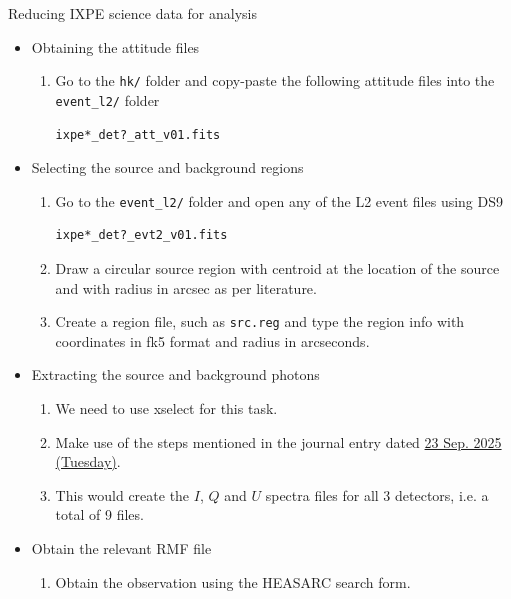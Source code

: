 	Reducing IXPE science data for analysis
	\begin{itemize}
		\item Obtaining the attitude files
		\begin{enumerate}
			\item Go to the \verb|hk/| folder and copy-paste the following attitude files into the \verb|event_l2/| folder
			\begin{verbatim}
ixpe*_det?_att_v01.fits
			\end{verbatim}
		\end{enumerate}
		
		\item Selecting the source and background regions
		\begin{enumerate}
			\item Go to the \verb|event_l2/| folder and open any of the L2 event files using DS9
			\begin{verbatim}
ixpe*_det?_evt2_v01.fits
			\end{verbatim}
			
			\item Draw a circular source region with centroid at the location of the source and with radius in arcsec as per literature.
			
			\item Create a region file, such as \verb|src.reg| and type the region info with coordinates in fk5 format and radius in arcseconds.
		\end{enumerate}
		
		\item Extracting the source and background photons
		\begin{enumerate}
			\item We need to use xselect for this task.
			
			\item Make use of the steps mentioned in the journal entry dated \hyperref[entry:20250923]{23 Sep. 2025 (Tuesday)}.
			
			\item This would create the $I$, $Q$ and $U$ spectra files for all 3 detectors, i.e. a total of 9 files.
		\end{enumerate}
		
		\item Obtain the relevant RMF file
		\begin{enumerate}
			\item Obtain the observation using the HEASARC search form.
			

\end{enumerate}
\end{itemize}
